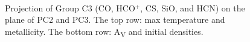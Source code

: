 \documentclass{aa}
\begin{document}
\begin{CJK*}{UTF8}{gbsn}
\begin{figure}[htbp]
\centering
{} 
\\
\caption{Projection of Group C3 (CO, HCO$^+$, CS, SiO, and HCN) on the plane of PC2 and PC3. The top row: max temperature and metallicity. The bottom row: A\textsubscript{V} and initial densities.}
\label{C3-23}
\end{figure}


\end{CJK*}
\end{document}
